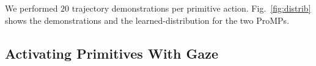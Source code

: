 \documentclass[runningheads,a4paper]{llncs}
\begin{document}
We performed $20$ trajectory demonstrations per primitive action.
Fig.~\ref{fig:distrib} shows the demonstrations and the learned-distribution for the two ProMPs. 

\subsection{Activating Primitives With Gaze}

%
\end{document}
